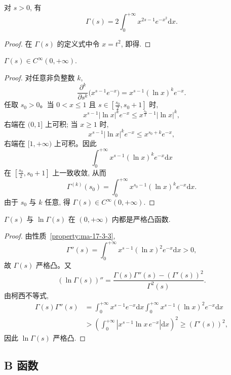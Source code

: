 \begin{property}\label{property:ma-17-3-2}
对 $s>0$, 有
\[
  \Gamma(s)=2\int_0^{+\infty}x^{2s-1}e^{-x^2}\mathrm dx.
\]
\end{property}


\begin{proof}
在 $\Gamma(s)$ 的定义式中令 $x=t^2$, 即得.
\end{proof}


\begin{property}\label{property:ma-17-3-3}
$\Gamma(s)\in C^\infty(0,+\infty)$.
\end{property}


\begin{proof}
对任意非负整数 $k$,
\[
  \frac{\partial^k}{\partial s^k}\bigl(x^{s-1}e^{-x}\bigr)
  =x^{s-1}(\ln x)^k e^{-x}.
\]
任取 $s_0>0$。当 $0<x\leqslant1$ 且 $s\in[\frac{s_0}2,s_0+1]$ 时,
\[
  x^{s-1}|\ln x|^k e^{-x}\leqslant x^{\frac{s_0}2-1}|\ln x|^k,
\]
右端在 $(0,1]$ 上可积; 当 $x\geqslant1$ 时,
\[
  x^{s-1}|\ln x|^k e^{-x}\leqslant x^{s_0+k}e^{-x},
\]
右端在 $[1,+\infty)$ 上可积。因此
\[
  \int_0^{+\infty}x^{s-1}(\ln x)^k e^{-x}\mathrm dx
\]
在 $[\frac{s_0}2,s_0+1]$ 上一致收敛, 从而
\[
  \Gamma^{(k)}(s_0)=\int_0^{+\infty}x^{s_0-1}(\ln x)^k e^{-x}\mathrm dx.
\]
由于 $s_0$ 与 $k$ 任意, 得 $\Gamma(s)\in C^\infty(0,+\infty)$.
\end{proof}


\begin{property}\label{property:ma-17-3-4}
$\Gamma(s)$ 与 $\ln\Gamma(s)$ 在 $(0,+\infty)$ 内都是严格凸函数.
\end{property}


\begin{proof}
由性质~\ref{property:ma-17-3-3},
\[
  \Gamma''(s)=\int_0^{+\infty}x^{s-1}(\ln x)^2e^{-x}\mathrm dx>0,
\]
故 $\Gamma(s)$ 严格凸。又
\[
  (\ln\Gamma(s))''=\frac{\Gamma(s)\Gamma''(s)-(\Gamma'(s))^2}{\Gamma^2(s)}.
\]
由柯西不等式,
\[
\begin{aligned}
  \Gamma(s)\Gamma''(s)
  &=
  \int_0^{+\infty}x^{s-1}e^{-x}\mathrm dx
  \int_0^{+\infty}x^{s-1}(\ln x)^2e^{-x}\mathrm dx\\
  &>
  \left(\int_0^{+\infty}|x^{s-1}\ln x\,e^{-x}|\mathrm dx\right)^2
  \geqslant(\Gamma'(s))^2,
\end{aligned}
\]
因此 $\ln\Gamma(s)$ 严格凸.
\end{proof}


\subsection{B 函数}
\label{subsec:ma-17-3-2}

